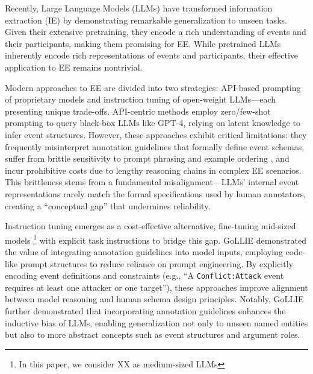 Recently, Large Language Models (LLMs) have transformed information extraction (IE) by demonstrating remarkable generalization to unseen tasks. Given their extensive pretraining, they encode a rich understanding of events and their participants, making them promising for EE. While pretrained LLMs inherently encode rich representations of events and participants, their effective application to EE remains nontrivial. 

Modern approaches to EE are divided into two strategies: API-based prompting of proprietary models and instruction tuning of open-weight LLMs—each presenting unique trade-offs. API-centric methods employ zero/few-shot prompting to query black-box LLMs like GPT-4, relying on latent knowledge to infer event structures. However, these approaches exhibit critical limitations: they frequently misinterpret annotation guidelines that formally define event schemas, suffer from brittle sensitivity to prompt phrasing and example ordering \citep{X}, and incur prohibitive costs due to lengthy reasoning chains in complex EE scenarios. This brittleness stems from a fundamental misalignment—LLMs' internal event representations rarely match the formal specifications used by human annotators, creating a ``conceptual gap'' that undermines reliability.

Instruction tuning emerges as a cost-effective alternative, fine-tuning mid-sized models \footnote{In this paper, we consider XX as medium-sized LLMs} with explicit task instructions to bridge this gap.  GoLLIE \citep{GoLLIE} demonstrated the value of integrating annotation guidelines into model inputs, employing code-like prompt structures \citep{code4struct} to reduce reliance on prompt engineering. By explicitly encoding event definitions and constraints (e.g., ``A \texttt{Conflict:Attack} event requires at least one attacker or one target''), these approaches improve alignment between model reasoning and human schema design principles. Notably, GoLLIE further demonstrated that incorporating annotation guidelines enhances the inductive bias of LLMs, enabling generalization not only to unseen named entities but also to more abstract concepts such as event structures and argument roles. 


